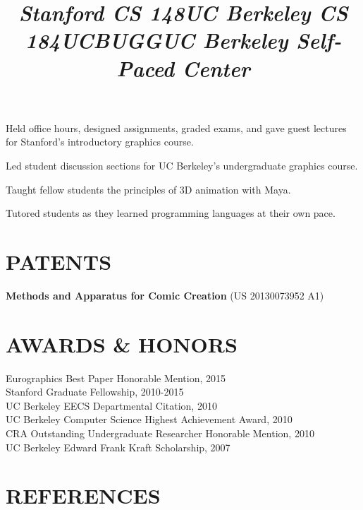 \documentclass[line,margin]{res}
\begin{document}
\begin{resume}
\title{\emph{Stanford CS 148}}
\begin{position}
Held office hours, designed assignments, graded exams, and gave guest lectures for Stanford's introductory graphics course.
\end{position}

\title{\emph{UC Berkeley CS 184}}
\begin{position}
Led student discussion sections for UC Berkeley's undergraduate graphics course.
\end{position}

\title{\emph{UCBUGG}}
\begin{position}
Taught fellow students the principles of 3D animation with Maya.
\end{position}

\title{\emph{UC Berkeley Self-Paced Center}}
\begin{position}
Tutored students as they learned programming languages at their own pace.
\end{position}


\section{PATENTS}

\textbf{Methods and Apparatus for Comic Creation} (US 20130073952 A1)

\section{AWARDS \& HONORS}
Eurographics Best Paper Honorable Mention, 2015 \\
Stanford Graduate Fellowship, 2010-2015 \\ 
UC Berkeley EECS Departmental Citation, 2010 \\
UC Berkeley Computer Science Highest Achievement Award, 2010 \\
CRA Outstanding Undergraduate Researcher Honorable Mention, 2010 \\
UC Berkeley Edward Frank Kraft Scholarship, 2007 \\


\section{REFERENCES}

\end{resume}
\end{document}
